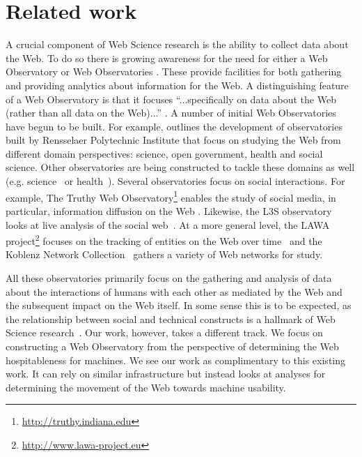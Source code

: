 \section{Related work}
\label{sec:related_work}

A crucial component of Web Science research is the ability
 to collect data about the Web.
To do so there is growing awareness for the need for either
 a Web Observatory or Web Observatories \cite{10.1109/MIS.2013.50}.
These provide facilities for both gathering and providing analytics about
 information for the Web.
A distinguishing feature of a Web Observatory is that it focuses
``...specifically on data about the Web (rather than all data on the Web)...'' \cite{10.1109/MIS.2013.50}.
A number of initial Web Observatories have begun to be built.
For example, \cite{Gloria:2013:EWS:2487788.2488170} outlines
 the development of observatories built by Rensselaer Polytechnic Institute
 that focus on studying the Web from different domain perspectives:
 science, open government, health and social science.
Other observatories are being constructed to tackle these domains as well
 (e.g. science~\cite{Naveed:2011:AAT:2527031.2527033}
 or health~\cite{luciano2013emergent}).
Several observatories focus on social interactions.
For example, The Truthy Web Observatory\footnote{\url{http://truthy.indiana.edu}}
 enables the study of social media, in particular,
 information diffusion on the Web \cite{McKelvey2013wow}.
Likewise, the L3S observatory looks at live analysis of
 the social web~\cite{Diaz-Aviles:2013:LAM:2487788.2488169}.
At a more general level,
 the LAWA project\footnote{\url{http://www.lawa-project.eu}}
 focuses on the tracking of entities on the Web
 over time~\cite{Spaniol:2012:TEW:2187980.2188030}
 and the Koblenz Network Collection~\cite{Kunegis:2013:KKN:2487788.2488173}
 gathers a variety of Web networks for study.

All these observatories primarily focus on the gathering and analysis
 of data about the interactions of humans with each other
 as mediated by the Web and the subsequent impact on the Web itself.
In some sense this is to be expected,
 as the relationship between social and technical constructs
 is a hallmark of Web Science research~\cite{Hendler:2008:WSI:1364782.1364798}.
Our work, however, takes a different track.
We focus on constructing a Web Observatory from the perspective of
 determining the Web hospitableness for machines.
We see our work as complimentary to this existing work.
It can rely on similar infrastructure but instead looks at
 analyses for determining the movement of the Web towards machine usability.

